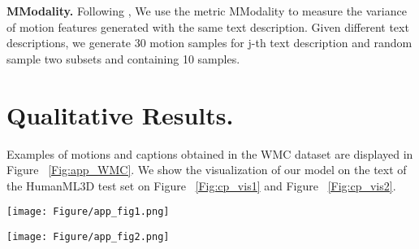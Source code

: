 \documentclass[letterpaper]{article} \usepackage{aaai24}
\begin{document}
\noindent\textbf{MModality.} Following \cite{guo2022generating}, We use the metric MModality to measure the variance of motion features generated with the same text description. Given  different text descriptions, we generate 30 motion samples for j-th text description and random sample two subsets  and  containing 10 samples.


\section{Qualitative Results.} Examples of motions and captions obtained in the WMC dataset are displayed in Figure ~\ref{Fig:app_WMC}. We show the visualization of our model on the text of the HumanML3D test set on Figure ~\ref{Fig:cp_vis1} and Figure ~\ref{Fig:cp_vis2}. 


\begin{figure*}[t] 
	\centering 
	\texttt{[image: Figure/app\_fig1.png]} 
	\caption{More examples of visualizations of the generated results of our model with classifier-free scale . The text of the motion descriptions is taken from the Humanml3d test set. we mark the actions that appear in the sentences in red, and the descriptions of the actions in blue.}
	\label{Fig:cp_vis1} 
\end{figure*}
\begin{figure*}[t] 
	\centering 
	\texttt{[image: Figure/app\_fig2.png]} 
\caption{More examples of visualizations of the generated results of our model with classifier-free scale . The text of the motion descriptions is taken from the Humanml3d test set. we mark the actions that appear in the sentences in red, and the descriptions of the actions in blue.}
	\label{Fig:cp_vis2} 
\end{figure*}





 
\end{document}
